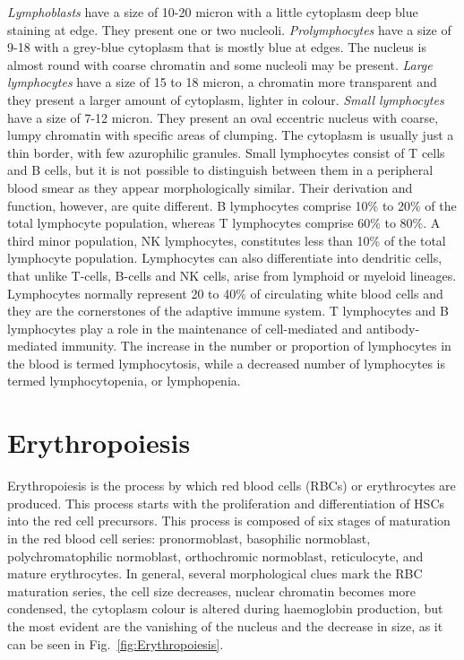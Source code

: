 \documentclass[final,a4paper,12pt,english]{UnicaPhdThesis3}
\begin{document}
	\textit{Lymphoblasts} have a size of 10-20 micron with a little cytoplasm deep blue staining at edge. They present one or two nucleoli. \textit{Prolymphocytes} have a size of 9-18 with a grey-blue cytoplasm that is mostly blue at edges. The nucleus is almost round with coarse chromatin and some nucleoli may be present. \textit{Large lymphocytes} have a size of 15 to 18 micron, a chromatin more transparent and they present a larger amount of cytoplasm, lighter in colour. \textit{Small lymphocytes} have a size of 7-12 micron. They present an oval eccentric nucleus with coarse, lumpy chromatin with specific areas of clumping. The cytoplasm is usually just a thin border, with few azurophilic granules. Small lymphocytes consist of T cells and B cells, but it is not possible to distinguish between them in a peripheral blood smear as they appear morphologically similar. Their derivation and function, however, are quite different. B lymphocytes comprise 10\% to 20\% of the total lymphocyte population, whereas T lymphocytes comprise 60\% to 80\%. A third minor population, NK lymphocytes, constitutes less than 10\% of the total lymphocyte population. Lymphocytes can also differentiate into dendritic cells, that unlike T-cells, B-cells and NK cells, arise from lymphoid or myeloid lineages. Lymphocytes normally represent 20 to 40\% of circulating white blood cells and they are the cornerstones of the adaptive immune system. T lymphocytes and B lymphocytes play a role in the maintenance of cell-mediated and antibody-mediated immunity. The increase in the number or proportion of lymphocytes in the blood is termed lymphocytosis, while a decreased number of lymphocytes is termed lymphocytopenia, or lymphopenia.
	
	\section{Erythropoiesis}
	Erythropoiesis is the process by which red blood cells (RBCs) or erythrocytes are produced. This process starts with the proliferation and differentiation of HSCs into the red cell precursors. This process is composed of six stages of maturation in the red blood cell series: pronormoblast, basophilic normoblast, polychromatophilic normoblast, orthochromic normoblast, reticulocyte, and mature erythrocytes. In general, several morphological clues mark the RBC maturation series, the cell size decreases, nuclear chromatin becomes more condensed, the cytoplasm colour is altered during haemoglobin production, but the most evident are the vanishing of the nucleus and the decrease in size, as it can be seen in Fig.~\ref{fig:Erythropoiesis}.
	
\end{document}
